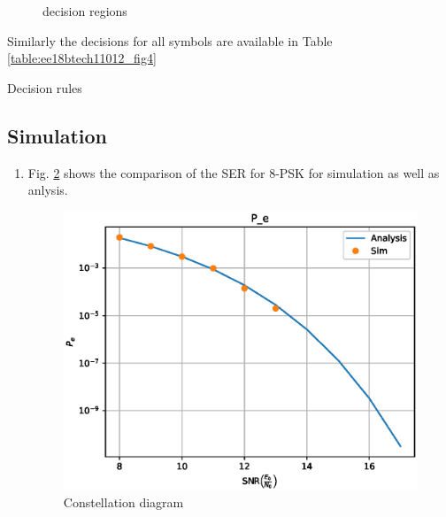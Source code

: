 \begin{enumerate}[label=\thesubsection.\arabic*.,ref=\thesubsection.\theenumi]
\begin{figure}[!ht]
                \resizebox{\columnwidth}{!}{}

\caption{decision regions}
\label{fig:ee18btech11012_fig2}
	
\end{figure}

%
%
%	
Similarly the decisions for all symbols 
are available in Table \ref{table:ee18btech11012_fig4}
%
\begin{table}[!ht]
                \resizebox{\columnwidth}{!}{}
\caption{Decision rules}
\label{table:ee18btech11012_fig4}
\end{table}
\end{enumerate}

\subsection{Simulation}
\begin{enumerate}[label=\thesubsection.\arabic*.,ref=\thesubsection.\theenumi]


\item Fig. \ref{fig:ee18btech11012_ser} shows the comparison of the SER for 8-PSK for simulation as well as anlysis.

\begin{figure}[!ht]
\includegraphics[width=\columnwidth]{./figs/ee18btech11012.eps}
\caption{Constellation diagram}
\label{fig:ee18btech11012_ser}
\end{figure}

\end{enumerate}
